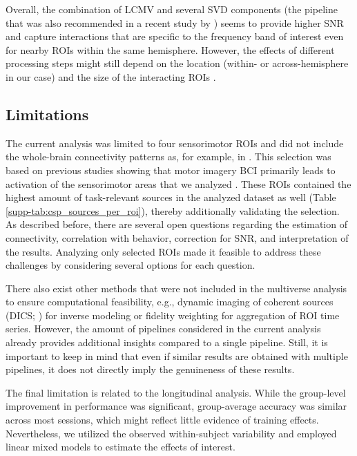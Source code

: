 \medskip

Overall, the combination of LCMV and several SVD components (the pipeline that was also recommended in a recent study by \cite{Pellegrini2023}) seems to provide higher SNR and capture interactions that are specific to the frequency band of interest even for nearby ROIs within the same hemisphere. However, the effects of different processing steps might still depend on the location (within- or across-hemisphere in our case) and the size of the interacting ROIs \citep{Mahjoory2017}.

\subsection{Limitations}
    
The current analysis was limited to four sensorimotor ROIs and did not include the whole-brain connectivity patterns as, for example, in \citep{Corsi2020}. This selection was based on previous studies showing that motor imagery BCI primarily leads to activation of the sensorimotor areas that we analyzed \citep{Nierhaus2021}. These ROIs contained the highest amount of task-relevant sources in the analyzed dataset as well (Table \ref{supp-tab:csp_sources_per_roi}), thereby additionally validating the selection. As described before, there are several open questions regarding the estimation of connectivity, correlation with behavior, correction for SNR, and interpretation of the results. Analyzing only selected ROIs made it feasible to address these challenges by considering several options for each question.

\medskip

There also exist other methods that were not included in the multiverse analysis to ensure computational feasibility, e.g., dynamic imaging of coherent sources (DICS; \cite{DICS_Gross2001}) for inverse modeling or fidelity weighting \citep{Korhonen2014} for aggregation of ROI time series. However, the amount of pipelines considered in the current analysis already provides additional insights compared to a single pipeline. Still, it is important to keep in mind that even if similar results are obtained with multiple pipelines, it does not directly imply the genuineness of these results.

\medskip 

The final limitation is related to the longitudinal analysis. While the group-level improvement in performance was significant, group-average accuracy was similar across most sessions, which might reflect little evidence of training effects. Nevertheless, we utilized the observed within-subject variability and employed linear mixed models to estimate the effects of interest.

